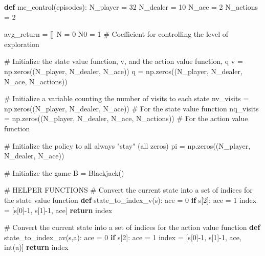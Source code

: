 \documentclass[
  letterpaper,
  DIV=11,
  numbers=noendperiod]{scrartcl}
\newenvironment{Shaded}{\begin{snugshade}}{\end{snugshade}}
\newcommand{\BuiltInTok}[1]{\textcolor[rgb]{0.00,0.23,0.31}{#1}}
\newcommand{\CommentTok}[1]{\textcolor[rgb]{0.37,0.37,0.37}{#1}}
\newcommand{\ControlFlowTok}[1]{\textcolor[rgb]{0.00,0.23,0.31}{\textbf{#1}}}
\newcommand{\DecValTok}[1]{\textcolor[rgb]{0.68,0.00,0.00}{#1}}
\newcommand{\KeywordTok}[1]{\textcolor[rgb]{0.00,0.23,0.31}{\textbf{#1}}}
\newcommand{\NormalTok}[1]{\textcolor[rgb]{0.00,0.23,0.31}{#1}}
\newcommand{\OperatorTok}[1]{\textcolor[rgb]{0.37,0.37,0.37}{#1}}
\begin{document}
\begin{Shaded}
\begin{Highlighting}[]
\KeywordTok{def}\NormalTok{ mc\_control(episodes):}
\NormalTok{    N\_player  }\OperatorTok{=} \DecValTok{32}
\NormalTok{    N\_dealer  }\OperatorTok{=} \DecValTok{10}
\NormalTok{    N\_ace     }\OperatorTok{=} \DecValTok{2}
\NormalTok{    N\_actions }\OperatorTok{=} \DecValTok{2}
    
\NormalTok{    avg\_return }\OperatorTok{=}\NormalTok{ []}
\NormalTok{    N          }\OperatorTok{=} \DecValTok{0}
\NormalTok{    N0         }\OperatorTok{=} \DecValTok{1} \CommentTok{\# Coefficient for controlling the level of exploration}
    
    \CommentTok{\# Initialize the state value function, v, and the action value function, q}
\NormalTok{    v }\OperatorTok{=}\NormalTok{ np.zeros((N\_player, N\_dealer, N\_ace))}
\NormalTok{    q }\OperatorTok{=}\NormalTok{ np.zeros((N\_player, N\_dealer, N\_ace, N\_actions))}
    
    \CommentTok{\# Initialize a variable counting the number of visits to each state}
\NormalTok{    nv\_visits }\OperatorTok{=}\NormalTok{ np.zeros((N\_player, N\_dealer, N\_ace))           }\CommentTok{\# For the state value function}
\NormalTok{    nq\_visits }\OperatorTok{=}\NormalTok{ np.zeros((N\_player, N\_dealer, N\_ace, N\_actions)) }\CommentTok{\# For the action value function}
    
    \CommentTok{\# Initialize the policy to all always "stay" (all zeros)}
\NormalTok{    pi }\OperatorTok{=}\NormalTok{ np.zeros((N\_player, N\_dealer, N\_ace))}
    
    \CommentTok{\# Initialize the game}
\NormalTok{    B  }\OperatorTok{=}\NormalTok{ Blackjack()}

    \CommentTok{\# HELPER FUNCTIONS}
    \CommentTok{\# Convert the current state into a set of indices for the state value function}
    \KeywordTok{def}\NormalTok{ state\_to\_index\_v(s):}
\NormalTok{        ace }\OperatorTok{=} \DecValTok{0}
        \ControlFlowTok{if}\NormalTok{ s[}\DecValTok{2}\NormalTok{]:}
\NormalTok{            ace }\OperatorTok{=} \DecValTok{1}
\NormalTok{        index }\OperatorTok{=}\NormalTok{ [s[}\DecValTok{0}\NormalTok{]}\OperatorTok{{-}}\DecValTok{1}\NormalTok{, s[}\DecValTok{1}\NormalTok{]}\OperatorTok{{-}}\DecValTok{1}\NormalTok{, ace]}
        \ControlFlowTok{return}\NormalTok{ index}
    
    \CommentTok{\# Convert the current state into a set of indices for the action value function}
    \KeywordTok{def}\NormalTok{ state\_to\_index\_av(s,a):}
\NormalTok{        ace }\OperatorTok{=} \DecValTok{0}
        \ControlFlowTok{if}\NormalTok{ s[}\DecValTok{2}\NormalTok{]:}
\NormalTok{            ace }\OperatorTok{=} \DecValTok{1}
\NormalTok{        index }\OperatorTok{=}\NormalTok{ [s[}\DecValTok{0}\NormalTok{]}\OperatorTok{{-}}\DecValTok{1}\NormalTok{, s[}\DecValTok{1}\NormalTok{]}\OperatorTok{{-}}\DecValTok{1}\NormalTok{, ace, }\BuiltInTok{int}\NormalTok{(a)]}
        \ControlFlowTok{return}\NormalTok{ index}
    

\end{Highlighting}
\end{Shaded}
\end{document}
